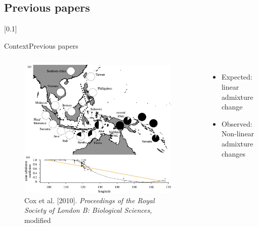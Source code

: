 \documentclass[10pt, aspectratio=43]{beamer}
\begin{document}
\subsection{Previous papers}
[0.1]{}{}{}
\begin{frame}{Context}{Previous papers}
\begin{columns}
  \begin{figure}
    \includegraphics[width=0.95\textwidth]{../data/cox-image-modified.jpg}
    \caption{Cox et al. [2010]. \textit{Proceedings of
the Royal Society of London B: Biological Sciences}, modified}
  \end{figure}

  \begin{itemize}
  	\item Expected: linear admixture change
    \item Observed: Non-linear admixture changes
  \end{itemize}

\end{columns}
\end{frame}
\end{document}
